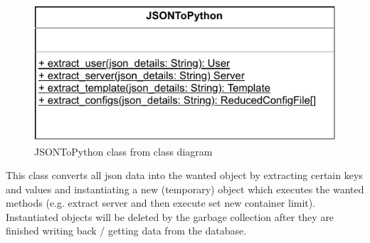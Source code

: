 
\begin{figure}[h]
        \centerline{\includegraphics[scale=1]{res/Klassen/JSONToPython.pdf}}
        \caption{JSONToPython class from class diagram}
\end{figure}

This class converts all json data into the wanted object by extracting certain keys and values and instantiating
a new (temporary) object which executes the wanted methods (e.g. extract server and then execute set new container limit).
Instantiated objects will be deleted by the garbage collection after they are finished writing back / getting data
from the database.

